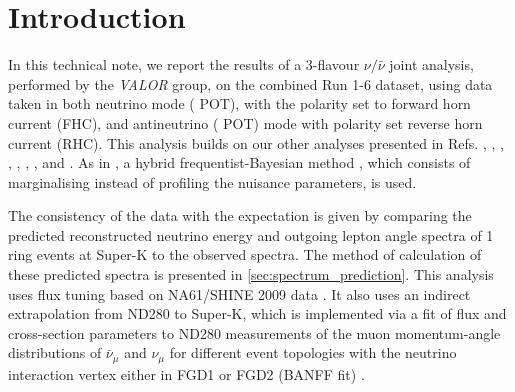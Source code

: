
\section {Introduction}
\label{sec:intro}

In this technical note, we report the results of a 3-flavour $\nu/\bar{\nu}$ joint analysis,
performed by the {\em VALOR} group,        
on the combined Run 1-6 dataset, using data taken in both 
neutrino mode (\TotalPotNu{} POT),
with the polarity set to forward horn current (FHC),
and antineutrino (\TotalPotNuBar{} POT) mode
with polarity set reverse horn current (RHC).
This analysis builds on our other analyses presented in Refs. 
\cite{OurRun1DisappAnalysis},
\cite{OurRun12DisappAnalysis}, 
\cite{OurRun12DisappAnalysis3Flavour},
\cite{OurRun123DisappAnalysis3Flavour},
\cite{OurRun1234aDisappAnalysis3Flavour},
\cite{OurRun1234DisappAnalysis3Flavour},
\cite{OurRun123JointOscillationAnalysis},
\cite{OurRun1234JointOscillationAnalysis} 
\cite{OurRun56AntiNumuDisappearanceAnalysis3Flavour}
and
\cite{OurRun56AntiNueBarAppearanceAnalysis3Flavour}.
As in \cite{OurRun56AntiNueBarAppearanceAnalysis3Flavour},
a hybrid frequentist-Bayesian method \cite{CousinsHighland}, 
which consists of marginalising instead of profiling 
the nuisance parameters, is used.

The consistency of the data with the expectation is given by comparing the predicted reconstructed neutrino energy 
and outgoing lepton angle spectra of 1 ring events at Super-K to the observed spectra. 
The method of calculation of these predicted spectra is presented in \cref{sec:spectrum_prediction}.
This analysis uses flux tuning based on NA61/SHINE 2009 data \cite{FluxTuning}\cite{NA61/SHINET2K}. 
It also uses an indirect extrapolation from ND280 to Super-K, which is implemented via a fit of flux and cross-section parameters to
ND280 measurements of the muon momentum-angle distributions of $\bar{\nu}_\mu$ and  $\nu_\mu$
for different event topologies
with the neutrino interaction vertex either in FGD1 or FGD2 (BANFF fit) \cite{BANFF2016}.


